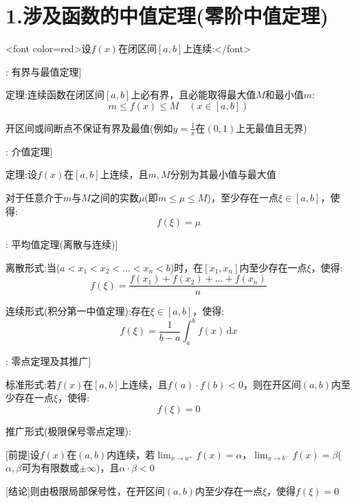 \documentclass[11pt,a4paper,UTF8]{ctexart}
\begin{document}
\section{1.涉及函数的中值定理(零阶中值定理)}

\textit{}<font color=red>设$f(x)$在闭区间$[a, b]$上连续:</font>\textit{}

\begin{thmbox}[定理[1]: 有界与最值定理]

定理:连续函数在闭区间$[a, b]$上必有界，且必能取得最大值$M$和最小值$m$:
\begin{equation*}
m \le f(x) \le M \quad(x \in [a, b])
\end{equation*}


  开区间或间断点不保证有界及最值(例如$y = \frac{1}{x}$在$(0, 1)$上无最值且无界) 

\end{thmbox}
\begin{thmbox}[定理[2]: 介值定理]

定理:设$f(x)$在$[a, b]$上连续，且$m, M$分别为其最小值与最大值 

对于任意介于$m$与$M$之间的实数$\mu$(即$m \le \mu \le M$)，至少存在一点$\xi \in [a, b]$，使得:
\begin{equation*}
f(\xi) = \mu
\end{equation*}


\end{thmbox}
\begin{thmbox}[定理[3]: 平均值定理(离散与连续)]

离散形式:当($a < x_1 < x_2 < \dots < x_n < b$)时，在$[x_1, x_n]$内至少存在一点$\xi$，使得:
\begin{equation*}
f(\xi) = \frac{f(x_1) + f(x_2) + \dots + f(x_n)}{n}
\end{equation*}


连续形式(积分第一中值定理):存在$\xi \in [a, b]$，使得:
\begin{equation*}
f(\xi) = \frac{1}{b - a} \int_a^b f(x)\,\mathrm{d}x
\end{equation*}


\end{thmbox}
\begin{thmbox}[定理[4]: 零点定理及其推广]

标准形式:若$f(x)$在$[a, b]$上连续，且$f(a) \cdot f(b) < 0$，则在开区间$(a, b)$内至少存在一点$\xi$，使得:
\begin{equation*}
f(\xi) = 0
\end{equation*}


推广形式(极限保号零点定理):

[前提]设$f(x)$在$(a, b)$内连续，若$\lim_{x \to a^+} f(x) = \alpha$，$\lim_{x \to b^-} f(x) = \beta$($\alpha, \beta$可为有限数或$\pm\infty$)，且$\alpha \cdot \beta < 0$ 

[结论]则由极限局部保号性，在开区间$(a, b)$内至少存在一点$\xi$，使得$f(\xi) = 0$ 

\end{thmbox}
\end{document}
